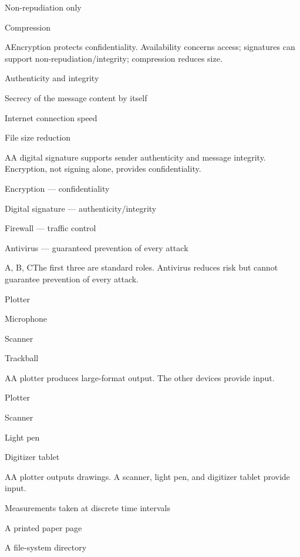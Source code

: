 \begin{enumerate}[label=\textbf{Q\arabic*.}, leftmargin=*]
{   \item Non-repudiation only
   \item Compression}
  {A}{Encryption protects confidentiality. Availability concerns access; signatures can support non-repudiation/integrity; compression reduces size.}
  {\item Authenticity and integrity
   \item Secrecy of the message content by itself
   \item Internet connection speed
   \item File size reduction}
  {A}{A digital signature supports sender authenticity and message integrity. Encryption, not signing alone, provides confidentiality.}
  {\item Encryption --- confidentiality
   \item Digital signature --- authenticity/integrity
   \item Firewall --- traffic control
   \item Antivirus --- guaranteed prevention of every attack}
  {A, B, C}{The first three are standard roles. Antivirus reduces risk but cannot guarantee prevention of every attack.}
\fi
\ifnum{}
  {\item Plotter
   \item Microphone
   \item Scanner
   \item Trackball}
  {A}{A plotter produces large-format output. The other devices provide input.}
  {\item Plotter
   \item Scanner
   \item Light pen
   \item Digitizer tablet}
  {A}{A plotter outputs drawings. A scanner, light pen, and digitizer tablet provide input.}
  {\item Measurements taken at discrete time intervals
   \item A printed paper page
   \item A file-system directory
}
\end{enumerate}
